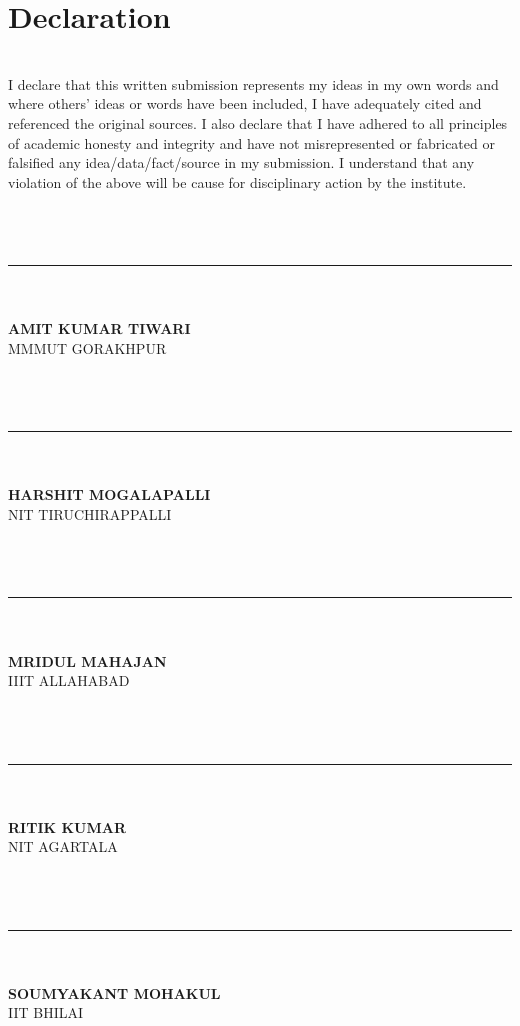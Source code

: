 \documentclass[12pt]{report}
\begin{document}
	\section*{Declaration}
	\textbf{\\}
	I declare that this written submission represents my ideas in my own words and where others’ ideas or words have been included, I have adequately cited and referenced the original sources. I also declare that I have adhered to all principles of academic honesty and integrity and have not misrepresented or fabricated or falsified any idea/data/fact/source in my submission. I understand that any violation of the above will be cause for disciplinary action by the institute.
	\textbf{\\\\\\\\}
	\begin{multicols}{2}
		\noindent\rule{5cm}{0.4pt}\\
		\textbf{\\AMIT KUMAR TIWARI} \\
		MMMUT GORAKHPUR\\
		\textbf{\\\\\\}
		\noindent\rule{5cm}{0.4pt}\\
		\textbf{\\HARSHIT MOGALAPALLI} \\
		NIT TIRUCHIRAPPALLI\\
		\textbf{\\\\\\}
		\noindent\rule{5cm}{0.4pt}\\
		\textbf{\\MRIDUL MAHAJAN} \\
		IIIT ALLAHABAD\\
		\textbf{\\\\\\}
		\columnbreak
		
		\noindent\rule{5cm}{0.4pt}\\
		\textbf{\\RITIK KUMAR} \\
		NIT AGARTALA\\
		\textbf{\\\\\\}
		\noindent\rule{5cm}{0.4pt}\\
		\textbf{\\SOUMYAKANT MOHAKUL} \\
		IIT BHILAI\\
		\textbf{\\\\}
	\end{multicols}
	\pagebreak
\end{document}
